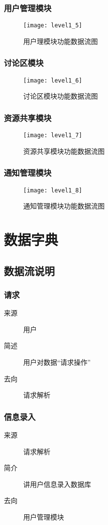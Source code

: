 \subsubsection{用户管理模块}
\begin{figure}[H]
\centering
\texttt{[image: level1\_5]}
\caption{用户理模块功能数据流图}
\end{figure}
\subsubsection{讨论区模块}
\begin{figure}[H]
\centering
\texttt{[image: level1\_6]}
\caption{讨论区模块功能数据流图}
\end{figure}
\subsubsection{资源共享模块}
\begin{figure}[H]
\centering
\texttt{[image: level1\_7]}
\caption{资源共享模块功能数据流图}
\end{figure}
\subsubsection{通知管理模块}
\begin{figure}[H]
\centering
\texttt{[image: level1\_8]}
\caption{通知管理模块功能数据流图}
\end{figure}

\section{数据字典}
\subsection{数据流说明}
\subsubsection{请求}
\begin{description}
  \item[来源]用户
  \item[简述]用户对数据“请求操作”
  \item[去向]请求解析
\end{description}

\subsubsection{信息录入}
\begin{description}
  \item[来源]请求解析
  \item[简介]讲用户信息录入数据库
  \item[去向]用户管理模块
\end{description}

